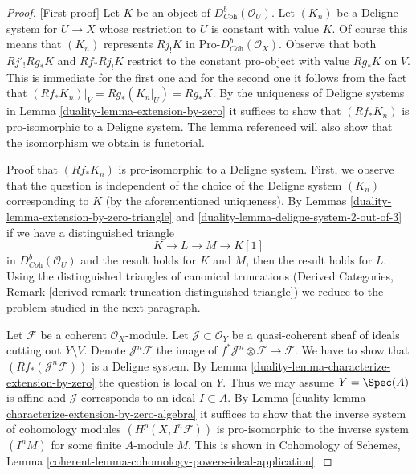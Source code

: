 \begin{proof}
[First proof]
Let $K$ be an object of $D^b_{\textit{Coh}}(\mathcal{O}_U)$. Let $(K_n)$
be a Deligne system for $U \to X$ whose restriction to $U$ is constant
with value $K$. Of course this means that $(K_n)$ represents $Rj_!K$
in $\text{Pro-}D^b_{\textit{Coh}}(\mathcal{O}_X)$. Observe that
both $Rj'_!Rg_*K$ and $Rf_*Rj_!K$ restrict to the constant pro-object with
value $Rg_*K$ on $V$. This is immediate for the first one and for the second
one it follows from the fact that $(Rf_*K_n)|_V = Rg_*(K_n|_U) = Rg_*K$.
By the uniqueness of Deligne systems in Lemma \ref{duality-lemma-extension-by-zero}
it suffices to show that $(Rf_*K_n)$ is pro-isomorphic to a
Deligne system. The lemma referenced will also show that the
isomorphism we obtain is functorial.

\medskip\noindent
Proof that $(Rf_*K_n)$ is pro-isomorphic to a Deligne system.
First, we observe that the question is independent of the choice
of the Deligne system $(K_n)$ corresponding to $K$ (by the aforementioned
uniqueness). By Lemmas \ref{duality-lemma-extension-by-zero-triangle} and
\ref{duality-lemma-deligne-system-2-out-of-3}
if we have a distinguished triangle
$$
K \to L \to M \to K[1]
$$
in $D^b_{\textit{Coh}}(\mathcal{O}_U)$ and the result holds for
$K$ and $M$, then the result holds for $L$. Using the distinguished
triangles of canonical truncations (Derived Categories, Remark
\ref{derived-remark-truncation-distinguished-triangle})
we reduce to the problem studied in the next paragraph.

\medskip\noindent
Let $\mathcal{F}$ be a coherent $\mathcal{O}_X$-module.
Let $\mathcal{J} \subset \mathcal{O}_Y$ be a quasi-coherent
sheaf of ideals cutting out $Y \setminus V$. Denote
$\mathcal{J}^n\mathcal{F}$ the image of
$f^*\mathcal{J}^n \otimes \mathcal{F} \to \mathcal{F}$.
We have to show that $(Rf_*(\mathcal{J}^n\mathcal{F}))$
is a Deligne system. By Lemma \ref{duality-lemma-characterize-extension-by-zero}
the question is local on $Y$. Thus we may assume $Y = \Spec(A)$ is affine
and $\mathcal{J}$ corresponds to an ideal $I \subset A$. By
Lemma \ref{duality-lemma-characterize-extension-by-zero-algebra}
it suffices to show that the inverse system of cohomology modules
$(H^p(X, I^n\mathcal{F}))$ is pro-isomorphic to the inverse system
$(I^n M)$ for some finite $A$-module $M$.
This is shown in Cohomology of Schemes, Lemma
\ref{coherent-lemma-cohomology-powers-ideal-application}.
\end{proof}

